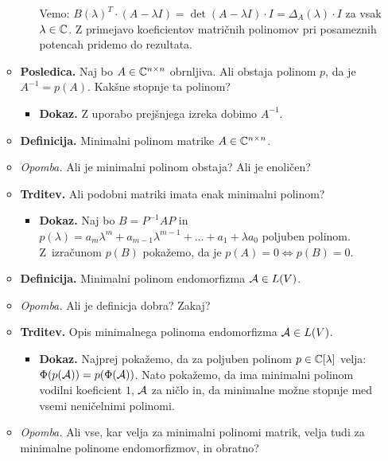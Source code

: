 \begin{enumerate}
\begin{itemize}
\begin{itemize}
            Vemo: $B(\lambda)^T \cdot (A - \lambda I) = \det (A - \lambda I) \cdot I = \Delta_A(\lambda) \cdot I$ za vsak $\lambda \in \mathbb{C}$. Z primejavo koeficientov matričnih polinomov pri posameznih potencah pridemo do rezultata.
        \end{itemize}
        \item \colorbox{orange!30}{\textbf{Posledica.}} Naj bo $A \in \mathbb{C}^{n \times n}$ obrnljiva. Ali obstaja polinom $p$, da je $A^{-1} = p(A)$. Kakšne stopnje ta polinom?
        \begin{itemize}
            \item \colorbox{green!30}{\textbf{Dokaz.}} Z uporabo prejšnjega izreka dobimo $A^{-1}$.
        \end{itemize}
        \item \colorbox{purple!30}{\textbf{Definicija.}} Minimalni polinom matrike $A \in \mathbb{C}^{n \times n}$.
        \item \colorbox{yellow!30}{\emph{Opomba.}} Ali je minimalni polinom obstaja? Ali je enoličen?
        \item \colorbox{blue!30}{\textbf{Trditev.}} Ali podobni matriki imata enak minimalni polinom?
        \begin{itemize}
            \item \colorbox{green!30}{\textbf{Dokaz.}} Naj bo $B = P^{-1}AP$ in $p(\lambda) = a_m\lambda^m + a_{m-1}\lambda^{m-1}+ \ldots + a_1 + \lambda a_0$ poljuben polinom. Z~izračunom $p(B)$ pokažemo, da je $p(A) = 0 \Leftrightarrow p(B) = 0$.
        \end{itemize}
        \item \colorbox{purple!30}{\textbf{Definicija.}} Minimalni polinom endomorfizma $\mathcal{A} \in L(V)$.
        \item \colorbox{yellow!30}{\emph{Opomba.}} Ali je definicja dobra? Zakaj?
        \item \colorbox{blue!30}{\textbf{Trditev.}} Opis minimalnega polinoma endomorfizma $\mathcal{A} \in L(V)$.
        \begin{itemize}
            \item \colorbox{green!30}{\textbf{Dokaz.}} Najprej pokažemo, da za poljuben polinom $p \in \mathbb{C}[\lambda]$ velja: $\Phi(p(\mathcal{A})) = p(\Phi(\mathcal{A}))$. Nato pokažemo, da ima minimalni polinom vodilni koeficient $1$, $\mathcal{A}$ za ničlo in, da minimalne možne stopnje med vsemi neničelnimi polinomi.
        \end{itemize}
        \item \colorbox{yellow!30}{\emph{Opomba.}} Ali vse, kar velja za minimalni polinomi matrik, velja tudi za minimalne polinome endomorfizmov, in obratno?

\end{itemize}
\end{enumerate}
